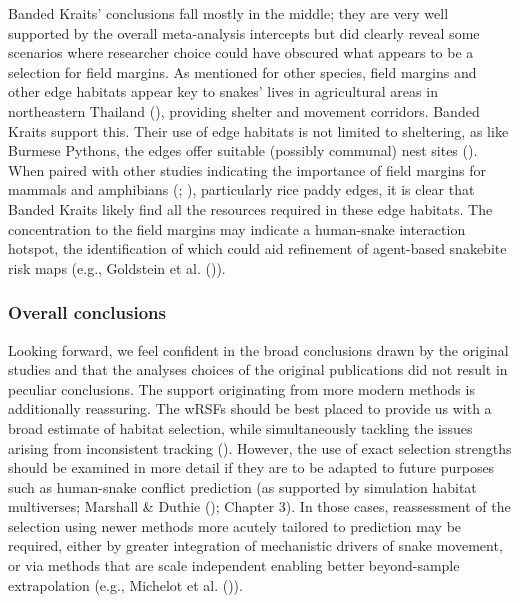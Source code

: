 \documentclass[10pt,a4paper]{article}
\begin{document}
Banded Kraits' conclusions fall mostly in the middle; they are very well supported by the overall meta-analysis intercepts but did clearly reveal some scenarios where researcher choice could have obscured what appears to be a selection for field margins.
As mentioned for other species, field margins and other edge habitats appear key to snakes' lives in agricultural areas in northeastern Thailand (), providing shelter and movement corridors.
Banded Kraits support this.
Their use of edge habitats is not limited to sheltering, as like Burmese Pythons, the edges offer suitable (possibly communal) nest sites ().
When paired with other studies indicating the importance of field margins for mammals and amphibians (; ), particularly rice paddy edges, it is clear that Banded Kraits likely find all the resources required in these edge habitats.
The concentration to the field margins may indicate a human-snake interaction hotspot, the identification of which could aid refinement of agent-based snakebite risk maps (e.g., Goldstein et al. ()).

\subsubsection{Overall conclusions}\label{overall-conclusions}

Looking forward, we feel confident in the broad conclusions drawn by the original studies and that the analyses choices of the original publications did not result in peculiar conclusions.
The support originating from more modern methods is additionally reassuring.
The wRSFs should be best placed to provide us with a broad estimate of habitat selection, while simultaneously tackling the issues arising from inconsistent tracking ().
However, the use of exact selection strengths should be examined in more detail if they are to be adapted to future purposes such as human-snake conflict prediction (as supported by simulation habitat multiverses; Marshall \& Duthie (); Chapter 3).
In those cases, reassessment of the selection using newer methods more acutely tailored to prediction may be required, either by greater integration of mechanistic drivers of snake movement, or via methods that are scale independent enabling better beyond-sample extrapolation (e.g., Michelot et al. ()).
\end{document}
